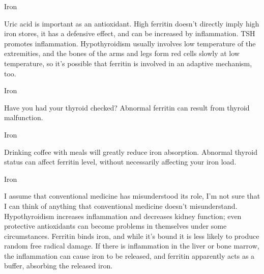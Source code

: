 \documentclass[11pt,oneside,openany,extrafontsizes]{memoir}
\begin{document}
\begin{standalonequote}{Iron}

    \begin{answer}
        Uric acid is important as an antioxidant. High ferritin doesn't directly imply high iron stores, it has a defensive effect, and can be increased by inflammation. TSH promotes inflammation. Hypothyroidism usually involves low temperature of the extremities, and the bones of the arms and legs form red cells slowly at low temperature, so it's possible that ferritin is involved in an adaptive mechanism, too.
    \end{answer}
\end{standalonequote}

\begin{standalonequote}{Iron}

    \begin{answer}
        Have you had your thyroid checked? Abnormal ferritin can result from thyroid malfunction.
    \end{answer}
\end{standalonequote}

\begin{standalonequote}{Iron}

    \begin{answer}
        Drinking coffee with meals will greatly reduce iron absorption. Abnormal thyroid status can affect ferritin level, without necessarily affecting your iron load.
    \end{answer}
\end{standalonequote}

\begin{standalonequote}{Iron}

    \begin{answer}
        I assume that conventional medicine has misunderstood its role, I'm not sure that I can think of anything that conventional medicine doesn't misunderstand. Hypothyroidism increases inflammation and decreases kidney function; even protective antioxidants can become problems in themselves under some circumstances. Ferritin binds iron, and while it's bound it is less likely to produce random free radical damage. If there is inflammation in the liver or bone marrow, the inflammation can cause iron to be released, and ferritin apparently acts as a buffer, absorbing the released iron.
    \end{answer}
\end{standalonequote}
\end{document}
